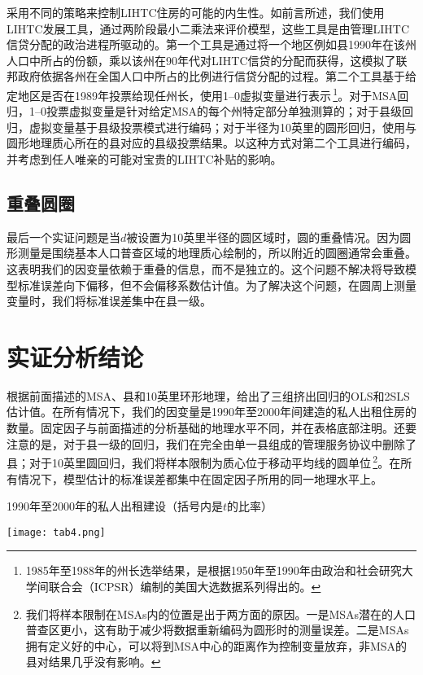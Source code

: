 \documentclass[lang=cn,11pt,a4paper]{paper}
\begin{document}
采用不同的策略来控制LIHTC住房的可能的内生性。如前言所述，我们使用LIHTC发展工具，通过两阶段最小二乘法来评价模型，这些工具是由管理LIHTC信贷分配的政治进程所驱动的。第一个工具是通过将一个地区例如县1990年在该州人口中所占的份额，乘以该州在90年代对LIHTC信贷的分配而获得，这模拟了联邦政府依据各州在全国人口中所占的比例进行信贷分配的过程。第二个工具基于给定地区是否在1989年投票给现任州长，使用1–0虚拟变量进行表示\,\footnote{1985年至1988年的州长选举结果，是根据1950年至1990年由政治和社会研究大学间联合会（ICPSR）编制的美国大选数据系列得出的。}。对于MSA回归，1–0投票虚拟变量是针对给定MSA的每个州特定部分单独测算的；对于县级回归，虚拟变量基于县级投票模式进行编码；对于半径为10英里的圆形回归，使用与圆形地理质心所在的县对应的县级投票结果。以这种方式对第二个工具进行编码，并考虑到任人唯亲的可能对宝贵的LIHTC补贴的影响。

\subsection{重叠圆圈}

最后一个实证问题是当$d$被设置为10英里半径的圆区域时，圆的重叠情况。因为圆形测量是围绕基本人口普查区域的地理质心绘制的，所以附近的圆圈通常会重叠。这表明我们的因变量依赖于重叠的信息，而不是独立的。这个问题不解决将导致模型标准误差向下偏移，但不会偏移系数估计值。为了解决这个问题，在圆周上测量变量时，我们将标准误差集中在县一级。

\section{实证分析结论}\label{sec5}

根据前面描述的MSA、县和10英里环形地理，给出了三组挤出回归的OLS和2SLS估计值。在所有情况下，我们的因变量是1990年至2000年间建造的私人出租住房的数量。固定因子与前面描述的分析基础的地理水平不同，并在表格底部注明。还要注意的是，对于县一级的回归，我们在完全由单一县组成的管理服务协议中删除了县；对于10英里圆回归，我们将样本限制为质心位于移动平均线的圆单位\,\footnote{我们将样本限制在MSAs内的位置是出于两方面的原因。一是MSAs潜在的人口普查区更小，这有助于减少将数据重新编码为圆形时的测量误差。二是MSAs拥有定义好的中心，可以将到MSA中心的距离作为控制变量放弃，非MSA的县对结果几乎没有影响。}。在所有情况下，模型估计的标准误差都集中在固定因子所用的同一地理水平上。

\begin{table}[h]
  \caption{1990年至2000年的私人出租建设（括号内是$t$的比率）}\label{tab4}
	\centering
	\texttt{[image: tab4.png]}
\end{table}
  
\end{document}

